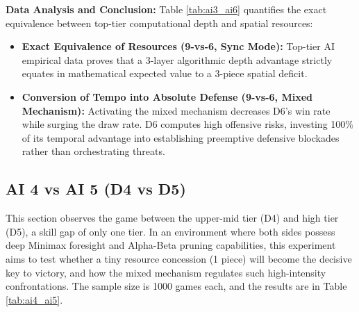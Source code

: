 \textbf{Data Analysis and Conclusion:} 
Table \ref{tab:ai3_ai6} quantifies the exact equivalence between top-tier computational depth and spatial resources:
\begin{itemize}
    \item \textbf{Exact Equivalence of Resources (9-vs-6, Sync Mode):} Top-tier AI empirical data proves that a 3-layer algorithmic depth advantage strictly equates in mathematical expected value to a 3-piece spatial deficit.
    \item \textbf{Conversion of Tempo into Absolute Defense (9-vs-6, Mixed Mechanism):} Activating the mixed mechanism decreases D6's win rate while surging the draw rate. D6 computes high offensive risks, investing 100\% of its temporal advantage into establishing preemptive defensive blockades rather than orchestrating threats.
\end{itemize}

\subsection{AI 4 vs AI 5 (D4 vs D5)}
\label{subsec:ai4_ai5}

This section observes the game between the upper-mid tier (D4) and high tier (D5), a skill gap of only one tier. In an environment where both sides possess deep Minimax foresight and Alpha-Beta pruning capabilities, this experiment aims to test whether a tiny resource concession (1 piece) will become the decisive key to victory, and how the mixed mechanism regulates such high-intensity confrontations. The sample size is 1000 games each, and the results are in Table \ref{tab:ai4_ai5}.

\begin{table}[htbp]
    \centering
    \caption{AI 4 vs AI 5 Simulation Data Distribution (Sample Size=1000)}
    \label{tab:ai4_ai5}
\end{table}

